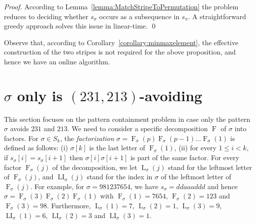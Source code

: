 \documentclass[a4paper]{llncs}
\DeclareMathOperator{\AV}{Av}
\newcommand{\pmotif}{\sigma}
\DeclareMathOperator{\firsta}{L}
\newcommand{\first}[2]{\firsta_{{#1}}({#2})}
\DeclareMathOperator{\firstia}{LI}
\newcommand{\firsti}[2]{\firstia_{{#1}}({#2})}
\DeclareMathOperator{\factora}{F}
\newcommand{\factor}[2]{\factora_{{#1}}({#2})}
\begin{document}
\begin{proof}
According to Lemma~\ref{lemma:MatchStripeToPermutation} the problem reduces
to deciding whether $s_\sigma$ occurs as a subsequence in $s_\pi$.
A straightforward greedy approach solves this issue in linear-time.
\qed
\end{proof}

Observe that, according to Corollary~\ref{corollary:minmaxelement},
the effective construction of the two stripes is not required for the above proposition,
and hence we have an online algorithm.


\section{$\sigma$ only is $(231,213)$-avoiding}
\label{section:sigma only avoid 231 and 213}

This section focuses on the pattern containment problem
in case only the pattern $\sigma$ avoids $231$ and $213$.
We need to consider a specific decomposition $\factora$ of $\sigma$ into factors.
For $\sigma \in S_k$, the \emph{factorization}
$\sigma = \factor{\pmotif}{p} \factor{\pmotif}{p-1} \ldots \factor{\pmotif}{1}$
is defined as follows:
(i) $\sigma[k]$ is the last letter of $\factor{\pmotif}{1}$,
(ii) for every $1 \leq i < k$,
if $s_\sigma[i] = s_\sigma[i+1]$ then
$\sigma[i]\sigma[i+1]$ is part of the same factor.
For every factor $\factor{\pmotif}{j}$ of the decomposition, we let
$\first{\pmotif}{j}$ stand for the leftmost letter of $\factor{\pmotif}{j}$,
and $\firsti{\pmotif}{j}$ stand for the index in $\sigma$
of the leftmost letter of $\factor{\pmotif}{j}$.
For example,
for $\sigma = 981237654$,
we have
$s_\sigma = ddaaaddd$ and hence
$\sigma = \factor{\pmotif}{3} \factor{\pmotif}{2} \factor{\pmotif}{1}$ with
$\factor{\pmotif}{1} =7654$, $\factor{\pmotif}{2} = 123$ and $\factor{\pmotif}{3} = 98$.
Furthermore,
$\first{\pmotif}{1} = 7$, $\first{\pmotif}{2} = 1$, $\first{\pmotif}{3} = 9$,
$\firsti{\pmotif}{1} = 6$, $\firsti{\pmotif}{2} = 3$ and $\firsti{\pmotif}{3} = 1$.
\end{document}
